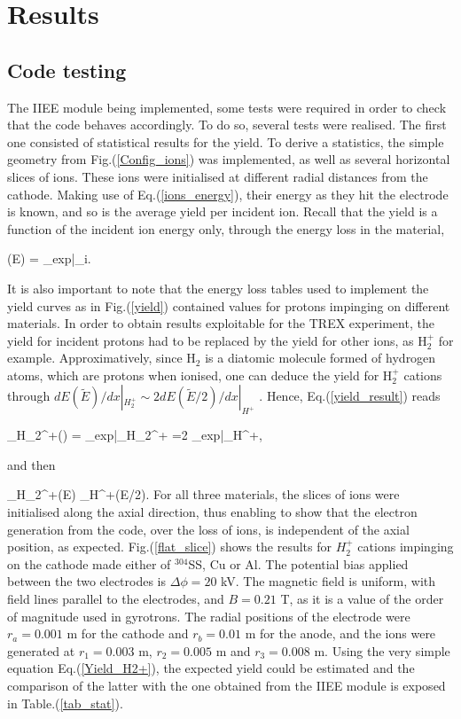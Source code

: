 \section{Results}\label{results}

\subsection{Code testing}\label{CodeTest_section}

The IIEE module being implemented, some tests were required in order to check that the code behaves accordingly. To do so, several tests were realised. The first one consisted of statistical results for the yield. To derive a statistics, the simple geometry from Fig.(\ref{Config_ions}) was implemented, as well as several horizontal slices of ions. These ions were initialised at different radial distances from the cathode. Making use of Eq.(\ref{ions_energy}), their energy as they hit the electrode is known, and so is the average yield per incident ion. Recall that the yield is a function of the incident ion energy only, through the energy loss in the material,

\beq
\gamma(E) = \Lambda_{exp}\cdot {}\Bigg|_i.\label{yield_result}
\eeq 

\noindent It is also important to note that the energy loss tables used to implement the yield curves as in Fig.(\ref{yield}) contained values for protons impinging on different materials. In order to obtain results exploitable for the TREX experiment, the yield for incident protons had to be replaced by the yield for other ions, as H$_2^{+}$ for example. Approximatively, since H$_{2}$ is a diatomic molecule formed of hydrogen atoms, which are protons when ionised, one can deduce the yield for H$_2^{+}$ cations through $dE(\tilde{E})/dx|_{H_2^{+}} \sim 2dE(\tilde{E}/2)/dx|_{H^{+}}$ \cite{HasselII}. Hence, Eq.(\ref{yield_result}) reads 

\beq
\gamma_{H_2^+}() = \Lambda_{exp}\cdot {}\Bigg|_{H_2^+} =2 \Lambda_{exp}\cdot {}\Bigg|_{H^+},
\eeq  

and then 

\beq
\gamma_{H_2^+}(E) \cdot \gamma_{H^+}(E/2). \label{Yield_H2+}
\eeq
\noindent For all three materials, the slices of ions were initialised along the axial direction, thus enabling to show that the electron generation from the code, over the loss of ions, is independent of the axial position, as expected. Fig.(\ref{flat_slice}) shows the results for $H_2^{+}$ cations impinging on the cathode made either of $^{304}$SS, Cu or Al. The potential bias applied between the two electrodes is $\Delta \phi=20$ kV. The magnetic field is uniform, with field lines parallel to the electrodes, and $B=0.21$ T, as it is a value of the order of magnitude used in gyrotrons. The radial positions of the electrode were $r_a=0.001$ m for the cathode and $r_b=0.01$ m for the anode, and the ions were generated at $r_1 = 0.003$ m, $r_2=0.005$ m and $r_3=0.008$ m. Using the very simple equation Eq.(\ref{Yield_H2+}), the expected yield could be estimated and the comparison of the latter with the one obtained from the IIEE module is exposed in Table.(\ref{tab_stat}). 

